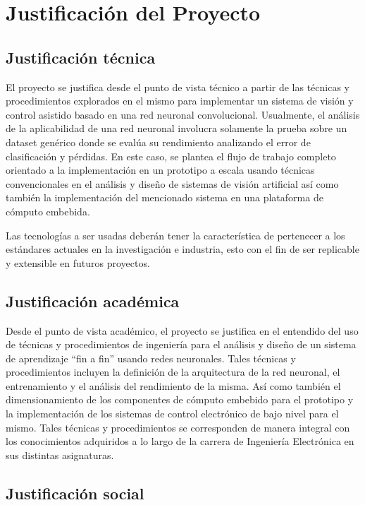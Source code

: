 \documentclass[12pt,letterpaper]{article}
\begin{document}
\section{Justificación del Proyecto}

\subsection{Justificación técnica}
El proyecto se justifica desde el punto de vista técnico a partir de las técnicas y procedimientos explorados 
en el mismo para implementar un sistema de visión y control asistido basado en una red neuronal convolucional. 
Usualmente, el análisis de la aplicabilidad de una red neuronal involucra solamente la prueba sobre un dataset 
genérico donde se evalúa su rendimiento analizando el error de clasificación y pérdidas. En este caso, se plantea el 
flujo de trabajo completo orientado a la implementación en un prototipo a escala usando técnicas convencionales en 
el análisis y diseño de sistemas de visión artificial así como también la implementación del mencionado sistema en 
una plataforma de cómputo embebida.

Las tecnologías a ser usadas deberán tener la característica de pertenecer a los estándares actuales en la 
investigación e industria, esto con el fin de ser replicable y extensible en futuros proyectos.

\subsection{Justificación académica}

Desde el punto de vista académico, el proyecto se justifica en el entendido del uso de técnicas y procedimientos 
de ingeniería para el análisis y diseño de un sistema de aprendizaje “fin a fin” usando redes neuronales. Tales 
técnicas y procedimientos incluyen la definición de la arquitectura de la red neuronal, el entrenamiento y el análisis 
del rendimiento de la misma. Así como también el dimensionamiento de los componentes de cómputo embebido para el 
prototipo y la implementación de los sistemas de control electrónico de bajo nivel para el mismo. Tales técnicas y 
procedimientos se corresponden de manera integral con los conocimientos adquiridos a lo largo de la carrera 
de Ingeniería Electrónica en sus distintas asignaturas.

\subsection{Justificación social}
\end{document}

